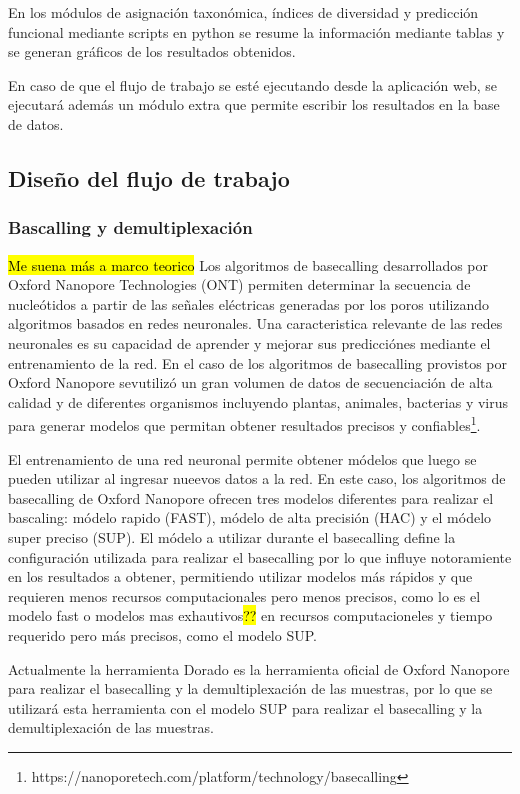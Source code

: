 En los módulos de asignación taxonómica, índices de diversidad y predicción funcional mediante scripts en python se resume la información mediante tablas y se generan gráficos de los resultados obtenidos.

En caso de que el flujo de trabajo se esté ejecutando desde la aplicación web, se ejecutará además un módulo extra que permite escribir los resultados en la base de datos.

\subsection{Diseño del flujo de trabajo}
\subsubsection{Bascalling y demultiplexación}
\hl{Me suena más a marco teorico}
Los algoritmos de basecalling desarrollados por Oxford Nanopore Technologies (ONT) permiten determinar la secuencia de nucleótidos a partir de las señales eléctricas generadas por los poros utilizando algoritmos basados en redes neuronales.
Una caracteristica relevante de las redes neuronales es su capacidad de aprender y mejorar sus predicciónes mediante el entrenamiento de la red.
En el caso de los algoritmos de basecalling provistos por Oxford Nanopore sevutilizó un gran volumen de datos de secuenciación de alta calidad y de diferentes organismos incluyendo plantas, animales, bacterias y virus para generar modelos que permitan obtener resultados precisos y confiables\footnote{https://nanoporetech.com/platform/technology/basecalling}.


El entrenamiento de una red neuronal permite obtener módelos que luego se pueden utilizar al ingresar nueevos datos a la red.
En este caso, los algoritmos de basecalling de Oxford Nanopore ofrecen tres modelos diferentes para realizar el bascaling: módelo rapido (FAST), módelo de alta precisión (HAC) y el módelo super preciso (SUP).
El módelo a utilizar durante el basecalling define la configuración utilizada para realizar el basecalling por lo que influye notoramiente en los resultados a obtener, permitiendo utilizar modelos más rápidos y que requieren menos recursos computacionales pero menos precisos, como lo es el modelo fast o modelos mas exhautivos\hl{??} en recursos computacioneles y tiempo requerido pero más precisos, como el modelo SUP.


Actualmente la herramienta Dorado es la herramienta oficial de Oxford Nanopore para realizar el basecalling y la demultiplexación de las muestras, por lo que se utilizará esta herramienta con el modelo SUP para realizar el basecalling y la demultiplexación de las muestras.
